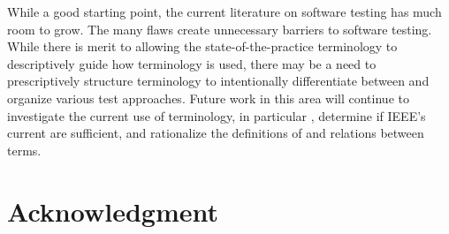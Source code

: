 \documentclass[conference]{IEEEtran}
\begin{document}
While a good starting point, the current literature on software testing has
much room to grow. The many flaws create unnecessary barriers to
software testing. While there is merit to allowing the state-of-the-practice
terminology to descriptively guide how terminology is used, there
may be a need to prescriptively structure terminology to intentionally
differentiate between and organize various test approaches. Future work in this
area will continue to investigate the current use of terminology, in
particular , determine if IEEE's current
 are sufficient, and rationalize the definitions of
and relations between terms.

\section*{Acknowledgment}


\newpage



\end{document}

